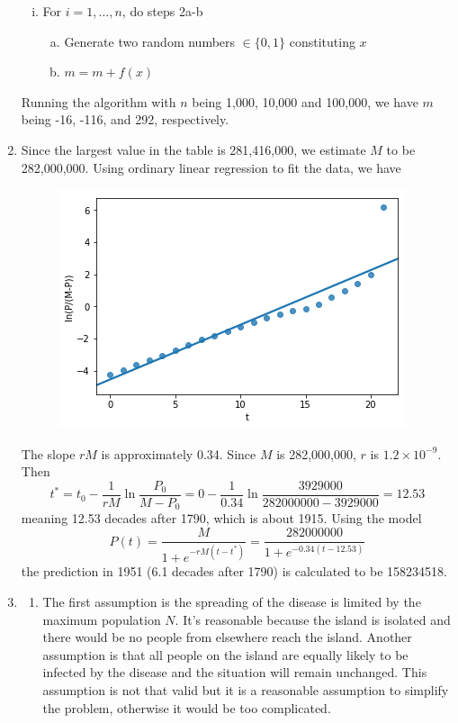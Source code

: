\documentclass[10pt]{report}
\begin{document}
\begin{enumerate}
\begin{enumerate}[i.]
		\item
		For $i=1, \dots, n$, do steps 2a-b
		\begin{enumerate}[a.]
			\item 
			Generate two random numbers $\in \{0, 1\}$ constituting $x$
			
			\item 
			$m = m + f(x)$
		\end{enumerate}
	\end{enumerate}
	Running the algorithm with $n$ being 1,000, 10,000 and 100,000, we have $m$ being -16, -116, and 292, respectively.
	
	\item 
	Since the largest value in the table is 281,416,000, we estimate $M$ to be 282,000,000. Using ordinary linear regression to fit the data, we have
	\begin{figure}[H]
		\centering
		\includegraphics[width=0.5\linewidth]{3.png}
	\end{figure}
	The slope $rM$ is approximately 0.34. Since $M$ is 282,000,000, $r$ is $1.2\times 10^{-9}$. Then
	\[
	t^* = t_0 - \frac{1}{rM} \ln \frac{P_0}{M-P_0} = 0 - \frac{1}{0.34} \ln \frac{3929000}{282000000 - 3929000} = 12.53
	\]
	meaning 12.53 decades after 1790, which is about 1915. Using the model
	\[
	P(t) = \frac{M}{1+e^{-rM(t-t^*)}} = \frac{282000000}{1+e^{-0.34(t-12.53)}}
	\]
	the prediction in 1951 (6.1 decades after 1790) is calculated to be 158234518.
	
	\item 
	\begin{enumerate}
		\item 
		The first assumption is the spreading of the disease is limited by the maximum population $N$. It's reasonable because the island is isolated and there would be no people from elsewhere reach the island. Another assumption is that all people on the island are equally likely to be infected by the disease and the situation will remain unchanged. This assumption is not that valid but it is a reasonable assumption to simplify the problem, otherwise it would be too complicated.
		

\end{enumerate}
\end{enumerate}
\end{document}
